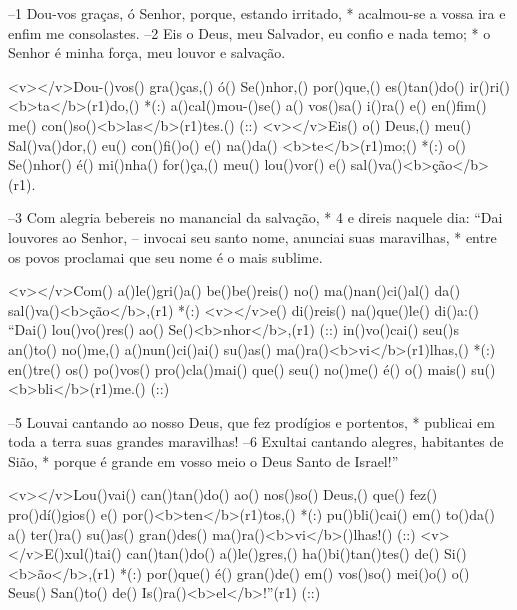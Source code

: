 –1 Dou-vos graças, ó Senhor, porque, estando irritado, *
acalmou-se a vossa ira e enfim me consolastes.
–2 Eis o Deus, meu Salvador, eu confio e nada temo; *
o Senhor é minha força, meu louvor e salvação.

<v></v>Dou-()vos() gra()ças,() ó() Se()nhor,() por()que,() es()tan()do() ir()ri()<b>ta</b>(r1)do,() *(:)
a()cal()mou-()se() a() vos()sa() i()ra() e() en()fim() me() con()so()<b>las</b>(r1)tes.() (::)
<v></v>Eis() o() Deus,() meu() Sal()va()dor,() eu() con()fi()o() e() na()da() <b>te</b>(r1)mo;() *(:)
o() Se()nhor() é() mi()nha() for()ça,() meu() lou()vor() e() sal()va()<b>ção</b>(r1).

–3 Com alegria bebereis no manancial da salvação, *
4 e direis naquele dia: “Dai louvores ao Senhor,
– invocai seu santo nome, anunciai suas maravilhas, *
entre os povos proclamai que seu nome é o mais sublime.

<v></v>Com() a()le()gri()a() be()be()reis() no() ma()nan()ci()al() da() sal()va()<b>ção</b>,(r1) *(:)
<v></v>e() di()reis() na()que()le() di()a:() ``Dai() lou()vo()res() ao() Se()<b>nhor</b>,(r1) (::)
in()vo()cai() seu()s an()to() no()me,() a()nun()ci()ai() su()as() ma()ra()<b>vi</b>(r1)lhas,() *(:)
en()tre() os() po()vos() pro()cla()mai() que() seu() no()me() é() o() mais() su()<b>bli</b>(r1)me.() (::)

–5 Louvai cantando ao nosso Deus, que fez prodígios e portentos, *
publicai em toda a terra suas grandes maravilhas!
–6 Exultai cantando alegres, habitantes de Sião, *
porque é grande em vosso meio o Deus Santo de Israel!”

<v></v>Lou()vai() can()tan()do() ao() nos()so() Deus,() que() fez() pro()dí()gios() e() por()<b>ten</b>(r1)tos,() *(:)
pu()bli()cai() em() to()da() a() ter()ra() su()as() gran()des() ma()ra()<b>vi</b>()lhas!() (::)
<v></v>E()xul()tai() can()tan()do() a()le()gres,() ha()bi()tan()tes() de() Si()<b>ão</b>,(r1) *(:)
por()que() é() gran()de() em() vos()so() mei()o() o() Seus() San()to() de() Is()ra()<b>el</b>!''(r1) (::)
